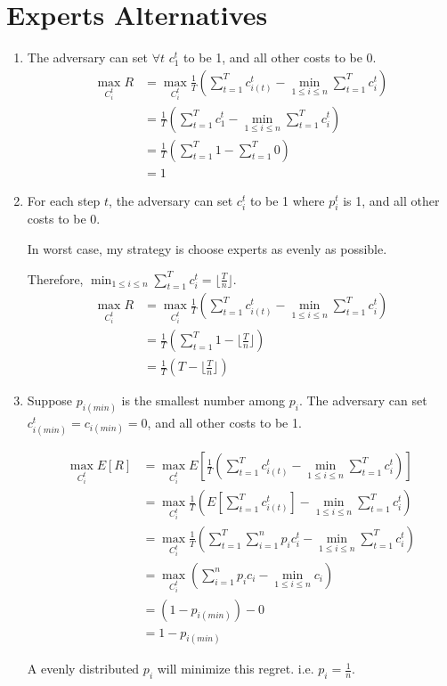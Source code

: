 \documentclass[11pt]{article}
\newenvironment{qparts}{\begin{enumerate}[{(}a{)}]}{\end{enumerate}}
\begin{document}
\section{Experts Alternatives}
\begin{qparts}
	\item 
	
	The adversary can set $\forall t$ $c_1^t$  to be 1, and all other costs to be 0.
	\begin{align*}
		\max_{C_i^t} R
		&= \max_{C_i^t} \frac{1}{T}(\sum_{t=1}^Tc_{i(t)}^t - \min_{1\le i \le n} \sum_{t=1}^T c_i^t) \\
		&= \frac{1}{T}(\sum_{t=1}^Tc_{1}^t - \min_{1\le i \le n} \sum_{t=1}^T c_i^t) \\
		&= \frac{1}{T}(\sum_{t=1}^T1- \sum_{t=1}^T 0) \\
		&= 1
	\end{align*}
	
	\item 
	
	For each step $t$, the adversary can set $c_i^t$ to be 1 where $p_i^t$ is 1, and all other costs to be 0.
	
	In worst case, my strategy is choose experts as evenly as possible. 
	
	Therefore, $\min_{1\le i \le n} \sum_{t=1}^T c_i^t = \lfloor \frac{T}{n}\rfloor$.
	\begin{align*}
		\max_{C_i^t} R
		&= \max_{C_i^t} \frac{1}{T}(\sum_{t=1}^Tc_{i(t)}^t - \min_{1\le i \le n} \sum_{t=1}^T c_i^t) \\
		&= \frac{1}{T}(\sum_{t=1}^T1- \lfloor \frac{T}{n}\rfloor) \\
		&= \frac{1}{T}(T - \lfloor \frac{T}{n}\rfloor)
	\end{align*}
	
	\item 
	
	Suppose $p_{i(min)}$ is the smallest number among $p_i$. The adversary can set $c_{i(min)}^t = c_{i(min)} = 0$, and all other costs to be 1.
	
	\begin{align*}
		\max_{C_i^t} E[R]
		&= \max_{C_i^t} E[\frac{1}{T}(\sum_{t=1}^Tc_{i(t)}^t - \min_{1\le i \le n} \sum_{t=1}^T c_i^t)] \\
		&= \max_{C_i^t} \frac{1}{T}(E[\sum_{t=1}^Tc_{i(t)}^t] - \min_{1\le i \le n} \sum_{t=1}^T c_i^t) \\
		&= \max_{C_i^t} \frac{1}{T}(\sum_{t=1}^T\sum_{i=1}^np_ic_{i}^t - \min_{1\le i \le n} \sum_{t=1}^T c_i^t) \\
		&= \max_{C_i^t} (\sum_{i=1}^np_ic_{i} - \min_{1\le i \le n} c_i) \\
		&= (1 - p_{i(min)}) - 0 \\
		&= 1 - p_{i(min)}
	\end{align*}
	
	A evenly distributed $p_i$ will minimize this regret. i.e. $p_i = \frac{1}{n}$.
	
\end{qparts}
\end{document}
